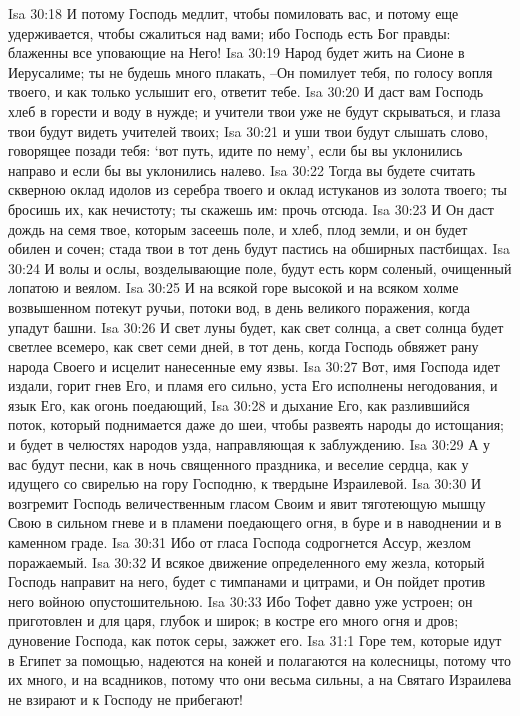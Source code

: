 Isa 30:18  И потому Господь медлит, чтобы помиловать вас, и потому еще удерживается, чтобы сжалиться над вами; ибо Господь есть Бог правды: блаженны все уповающие на Него!
Isa 30:19  Народ будет жить на Сионе в Иерусалиме; ты не будешь много плакать, --Он помилует тебя, по голосу вопля твоего, и как только услышит его, ответит тебе.
Isa 30:20  И даст вам Господь хлеб в горести и воду в нужде; и учители твои уже не будут скрываться, и глаза твои будут видеть учителей твоих;
Isa 30:21  и уши твои будут слышать слово, говорящее позади тебя: `вот путь, идите по нему', если бы вы уклонились направо и если бы вы уклонились налево.
Isa 30:22  Тогда вы будете считать скверною оклад идолов из серебра твоего и оклад истуканов из золота твоего; ты бросишь их, как нечистоту; ты скажешь им: прочь отсюда.
Isa 30:23  И Он даст дождь на семя твое, которым засеешь поле, и хлеб, плод земли, и он будет обилен и сочен; стада твои в тот день будут пастись на обширных пастбищах.
Isa 30:24  И волы и ослы, возделывающие поле, будут есть корм соленый, очищенный лопатою и веялом.
Isa 30:25  И на всякой горе высокой и на всяком холме возвышенном потекут ручьи, потоки вод, в день великого поражения, когда упадут башни.
Isa 30:26  И свет луны будет, как свет солнца, а свет солнца будет светлее всемеро, как свет семи дней, в тот день, когда Господь обвяжет рану народа Своего и исцелит нанесенные ему язвы.
Isa 30:27  Вот, имя Господа идет издали, горит гнев Его, и пламя его сильно, уста Его исполнены негодования, и язык Его, как огонь поедающий,
Isa 30:28  и дыхание Его, как разлившийся поток, который поднимается даже до шеи, чтобы развеять народы до истощания; и будет в челюстях народов узда, направляющая к заблуждению.
Isa 30:29  А у вас будут песни, как в ночь священного праздника, и веселие сердца, как у идущего со свирелью на гору Господню, к твердыне Израилевой.
Isa 30:30  И возгремит Господь величественным гласом Своим и явит тяготеющую мышцу Свою в сильном гневе и в пламени поедающего огня, в буре и в наводнении и в каменном граде.
Isa 30:31  Ибо от гласа Господа содрогнется Ассур, жезлом поражаемый.
Isa 30:32  И всякое движение определенного ему жезла, который Господь направит на него, будет с тимпанами и цитрами, и Он пойдет против него войною опустошительною.
Isa 30:33  Ибо Тофет давно уже устроен; он приготовлен и для царя, глубок и широк; в костре его много огня и дров; дуновение Господа, как поток серы, зажжет его.
Isa 31:1  Горе тем, которые идут в Египет за помощью, надеются на коней и полагаются на колесницы, потому что их много, и на всадников, потому что они весьма сильны, а на Святаго Израилева не взирают и к Господу не прибегают!

